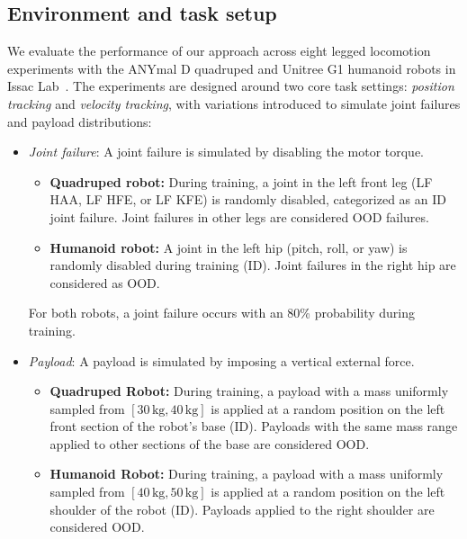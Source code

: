 \label{sec:experiments}
\subsection{Environment and task setup}
We evaluate the performance of our approach across eight legged locomotion experiments with the ANYmal D quadruped and Unitree G1 humanoid robots in Issac Lab~\citep{mittal2023orbit}.
The experiments are designed around two core task settings: \textit{position tracking} and \textit{velocity tracking}, with variations introduced to simulate joint failures and payload distributions:
\begin{itemize}
    \item \textit{Joint failure}:  A joint failure is simulated by disabling the motor torque.
    \begin{itemize}
        \item \textbf{Quadruped robot:} During training, a joint in the left front leg (LF HAA, LF HFE, or LF KFE) is randomly disabled, categorized as an ID joint failure. 
        Joint failures in other legs are considered OOD failures.
        \item \textbf{Humanoid robot:} A joint in the left hip (pitch, roll, or yaw) is randomly disabled during training (ID). 
        Joint failures in the right hip are considered as OOD.
    \end{itemize}
    For both robots, a joint failure occurs with an 80\% probability during training.
    \item \textit{Payload}:  A payload is simulated by imposing a vertical external force.
    \begin{itemize}
        \item \textbf{Quadruped Robot:} During training, a payload with a mass uniformly sampled from \([30\,\text{kg}, 40\,\text{kg}]\) is applied at a random position on the left front section of the robot's base (ID). 
        Payloads with the same mass range applied to other sections of the base are considered OOD.
        
        \item \textbf{Humanoid Robot:} During training, a payload with a mass uniformly sampled from \([40\,\text{kg}, 50\,\text{kg}]\) is applied at a random position on the left shoulder of the robot (ID). 
        Payloads applied to the right shoulder are considered OOD.

    \end{itemize}
\end{itemize}

